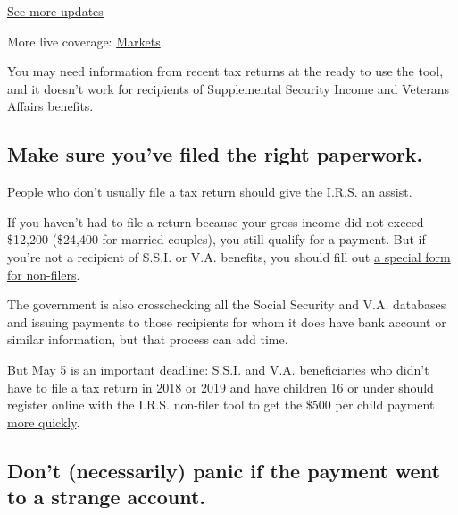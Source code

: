 \href{https://www.nytimes.com/2020/08/01/world/coronavirus-covid-19.html?action=click\&pgtype=Article\&state=default\&region=MAIN_CONTENT_1\&context=storylines_live_updates}{See
more updates}

More live coverage:
\href{https://www.nytimes.com/live/2020/07/31/business/stock-market-today-coronavirus?action=click\&pgtype=Article\&state=default\&region=MAIN_CONTENT_1\&context=storylines_live_updates}{Markets}

You may need information from recent tax returns at the ready to use the
tool, and it doesn't work for recipients of Supplemental Security Income
and Veterans Affairs benefits.

\hypertarget{make-sure-youve-filed-the-right-paperwork}{%
\subsection{Make sure you've filed the right
paperwork.}\label{make-sure-youve-filed-the-right-paperwork}}

People who don't usually file a tax return should give the I.R.S. an
assist.

If you haven't had to file a return because your gross income did not
exceed \$12,200 (\$24,400 for married couples), you still qualify for a
payment. But if you're not a recipient of S.S.I. or V.A. benefits, you
should fill out
\href{https://www.irs.gov/coronavirus/non-filers-enter-payment-info-here}{a
special form for non-filers}.

The government is also crosschecking all the Social Security and V.A.
databases and issuing payments to those recipients for whom it does have
bank account or similar information, but that process can add time.

But May 5 is an important deadline: S.S.I. and V.A. beneficiaries who
didn't have to file a tax return in 2018 or 2019 and have children 16 or
under should register online with the I.R.S. non-filer tool to get the
\$500 per child payment
\href{https://www.irs.gov/newsroom/va-ssi-recipients-with-eligible-children-need-to-act-by-tuesday-may-5-to-quickly-add-money-to-their-automatic-economic-impact-payment-plus-500-push-continues}{more
quickly}.

\hypertarget{dont-necessarily-panic-if-the-payment-went-to-a-strange-account}{%
\subsection{Don't (necessarily) panic if the payment went to a strange
account.}\label{dont-necessarily-panic-if-the-payment-went-to-a-strange-account}}

